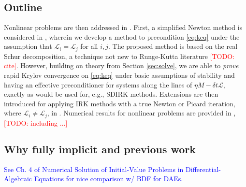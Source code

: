 \documentclass[review]{siamart}
\makeatletter
\newcommand{\tcb}{\textcolor{blue}}
\newcommand{\todo}[1]{\textcolor{red}{[TODO\@: #1]}}
\makeatother
\begin{document}
\subsection{Outline}\label{sec:intro:outline}

Nonlinear problems are then addressed in . First, a
simplified Newton method is considered in ,
wherein we develop a method to precondition
\eqref{eq:keq} under the assumption that $\mathcal{L}_i=\mathcal{L}_j$ for all
$i,j$. The proposed method is based on the real Schur decomposition, a technique
not new to Runge-Kutta literature \todo{cite}. However, building on theory from
Section \ref{sec:solve}, we are able to \textit{prove} rapid Krylov convergence
on \eqref{eq:keq}
under basic assumptions of stability and having an effective preconditioner for
systems along the lines of $\eta M - \delta t\mathcal{L}$, exactly as would be
used for, e.g., SDIRK methods. Extensions are then introduced for applying IRK
methods with a true Newton or Picard iteration, where $\mathcal{L}_i\neq
\mathcal{L}_j$, in . Numerical results for nonlinear
problems are provided in , \todo{including ...}


\subsection{Why fully implicit and previous work}\label{sec:intro:hist}

\tcb{See Ch. 4 of Numerical Solution of Initial-Value Problems in Differential-Algebraic Equations
for nice comparison w/ BDF for DAEs.}


\end{document}
